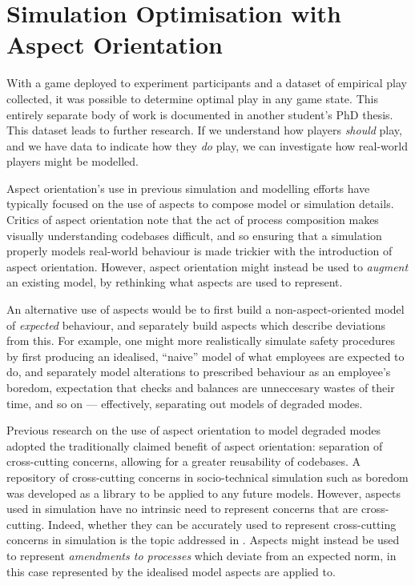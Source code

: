 \chapter{Simulation Optimisation with Aspect Orientation}\label{chap:exp1_simulation_optimisation}

With a game deployed to experiment participants and a dataset of empirical play
collected, it was possible to determine optimal play in any game state. This
entirely separate body of work is documented in another student's PhD
thesis. This dataset leads to
further research. If we understand how players \emph{should} play, and we have
data to indicate how they \emph{do} play, we can investigate how real-world
players might be modelled. 


Aspect orientation's use in previous simulation and modelling efforts have
typically focused on the use of aspects to compose model or simulation
details. Critics of aspect orientation note that
the act of process composition makes visually understanding codebases difficult,
and so ensuring that a simulation properly models real-world behaviour is made
trickier with the introduction of aspect orientation. However, aspect
orientation might instead be used to \emph{augment} an existing model, by
rethinking what aspects are used to represent.

An alternative use of aspects would be to first build a non-aspect-oriented
model of \emph{expected} behaviour, and separately build aspects which describe
deviations from this. For example, one might more realistically simulate safety
procedures by first producing an idealised, ``naive'' model of what employees
are expected to do, and separately model alterations to prescribed behaviour as
an employee's boredom, expectation that checks and balances are unneccesary
wastes of their time, and so on --- effectively, separating out models of
degraded modes\cite{johnson2007degradedmodes}.

Previous research on the use of aspect orientation to model degraded modes
adopted the traditionally claimed benefit of aspect orientation: separation of
cross-cutting concerns, allowing for a greater reusability of
codebases\cite{wallis2018caise}. A repository of cross-cutting concerns in
socio-technical simulation such as boredom was developed as a library to be
applied to any future models\cite{fuzzimoss_repo}. However, aspects used in
simulation have no intrinsic need to represent concerns that are cross-cutting.
Indeed, whether they can be accurately used to represent cross-cutting concerns
in simulation is the topic addressed in . Aspects
might instead be used to represent \emph{amendments to processes} which deviate
from an expected norm, in this case represented by the idealised model aspects
are applied to.

